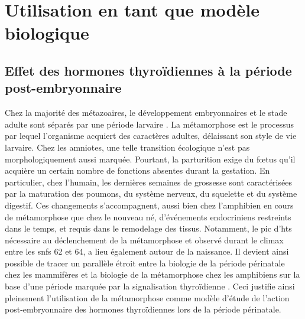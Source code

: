 \documentclass[../main.tex]{subfiles}
\begin{document}



\section{Utilisation en tant que modèle biologique}


\subsection{Effet des hormones thyroïdiennes à la période post-embryonnaire}
Chez la majorité des métazoaires, le développement embryonnaires et le stade adulte sont séparés par une période larvaire \citep{Laudet2011b,Holstein2014}.
La métamorphose est le processus par lequel l'organisme acquiert des caractères adultes, délaissant son style de vie larvaire.
Chez les amniotes, une telle transition écologique n'est pas morphologiquement aussi marquée.
Pourtant, la parturition exige du fœtus qu'il acquière un certain nombre de fonctions absentes durant la gestation.
En particulier, chez l'humain, les dernières semaines de grossesse sont caractérisées par la maturation des poumons, du système nerveux, du squelette et du système digestif.
Ces changements s'accompagnent, aussi bien chez l'amphibien en cours de métamorphose que chez le nouveau né, d'événements endocriniens restreints dans le temps, et requis dans le remodelage des tissus.
Notamment, le pic d'\glspl{ht} nécessaire au déclenchement de la métamorphose et observé durant le climax entre les \glspl{snf} 62 et 64, a lieu également autour de la naissance.
Il devient ainsi possible de tracer un parallèle étroit entre la biologie de la période périnatale chez les mammifères et la biologie de la métamorphose chez les amphibiens sur la base d'une période marquée par la signalisation thyroïdienne \citep{Laudet2011b}.
Ceci justifie ainsi pleinement l'utilisation de la métamorphose comme modèle d'étude de l'action post-embryonnaire des hormones thyroïdiennes lors de la période périnatale. 

\end{document}
